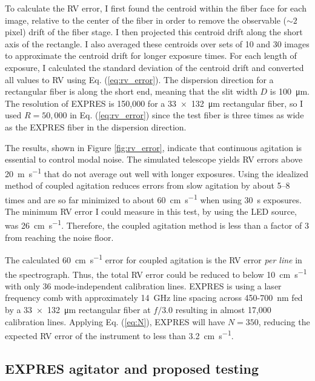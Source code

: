 \documentclass[11pt]{article}
\begin{document}
To calculate the RV error, I first found the centroid within the fiber face for each image, relative to the center of the fiber in order to remove the observable ($\sim 2$ pixel) drift of the fiber stage. I then projected this centroid drift along the short axis of the rectangle. I also averaged these centroids over sets of 10 and 30 images to approximate the centroid drift for longer exposure times. For each length of exposure, I calculated the standard deviation of the centroid drift and converted all values to RV using Eq. (\ref{eq:rv_error}). The dispersion direction for a rectangular fiber is along the short end, meaning that the slit width $D$ is \SI{100}{\micro\meter}. The resolution of EXPRES is 150,000 for a \SI{33x132}{\micro\meter} rectangular fiber, so I used $R=50,000$ in Eq. (\ref{eq:rv_error}) since the test fiber is three times as wide as the EXPRES fiber in the dispersion direction.

The results, shown in Figure \ref{fig:rv_error}, indicate that continuous agitation is essential to control modal noise. The simulated telescope yields RV errors above \SI{20}{\meter\per\second} that do not average out well with longer exposures. Using the idealized method of coupled agitation reduces errors from slow agitation by about 5--8 times and are so far minimized to about \SI{60}{\centi\meter\per\second} when using \SI{30}{\second} exposures. The minimum RV error I could measure in this test, by using the LED source, was \SI{26}{\centi\meter\per\second}. Therefore, the coupled agitation method is less than a factor of 3 from reaching the noise floor.

The calculated \SI{60}{\centi\meter\per\second} error for coupled agitation is the RV error \textit{per line} in the spectrograph. Thus, the total RV error could be reduced to below \SI{10}{\centi\meter\per\second} with only 36 mode-independent calibration lines. EXPRES is using a laser frequency comb with approximately {\SI{14}{\giga\hertz}} line spacing across 450-{\SI{700}{\nano\meter}} fed by a {\SI{33x132}{\micro\meter}} rectangular fiber at $f/3.0$ resulting in almost 17,000 calibration lines. Applying Eq. (\ref{eq:N}), EXPRES will have $N=350$, reducing the expected RV error of the instrument to less than {\SI{3.2}{\centi\meter\per\second}}.

\subsection{EXPRES agitator and proposed testing}
\label{subsec:modal_noise_testing}
\end{document}
